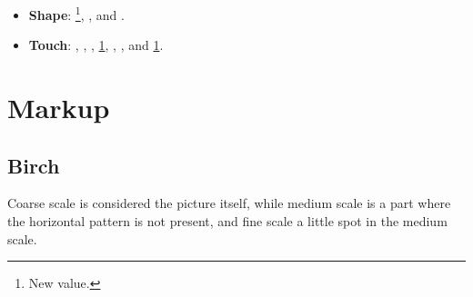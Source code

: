 \documentclass[12pt,a4paper]{article}
\begin{document}
\begin{singlespace}
\begin{itemize}
	\item \textbf{Shape}: \sfl\footnote{\label{new}New value.}, \sro, \sexor and \sexdi.
	\item \textbf{Touch}: \tfu, \tfe, \tco, \tro\cref{new}, \tbu, \tsc, \tsm and \tve\cref{new}.
\end{itemize}

\section{Markup}

\newcommand{\imageSize}{0.30}
\newcommand{\dataSize}{0.65}
\newcommand{\spaceSize}{0.02}

\newcommand{\mat}{Birch}
\newcommand{\Number}{01}
\newcommand{\InputImage}[8]{
\begin{figure}[!ht]
    \centering
    \begin{minipage}{\imageSize\textwidth}
        \centering
        \texttt{[image: ../../Dataset/\\mat/\\Number.png]}
    \end{minipage}
    \hspace{\spaceSize\textwidth}
    \begin{minipage}{\dataSize\textwidth}
        \textbf{\large \mat \xspace \Number}:

        #7
        \begin{itemize}
            \item \Fine: #1, #2.
            \item \Medium: #3, #4.
            \item \Coarse: #5, #6.
        \end{itemize}
        #8
    \end{minipage}
\end{figure}
\FloatBarrier    
}

\renewcommand{\mat}{Birch}
\subsection{\mat}
Coarse scale is considered the picture itself, while medium scale is a part where the horizontal pattern is not present, and fine scale a little spot in the medium scale.


\end{singlespace}
\end{document}
